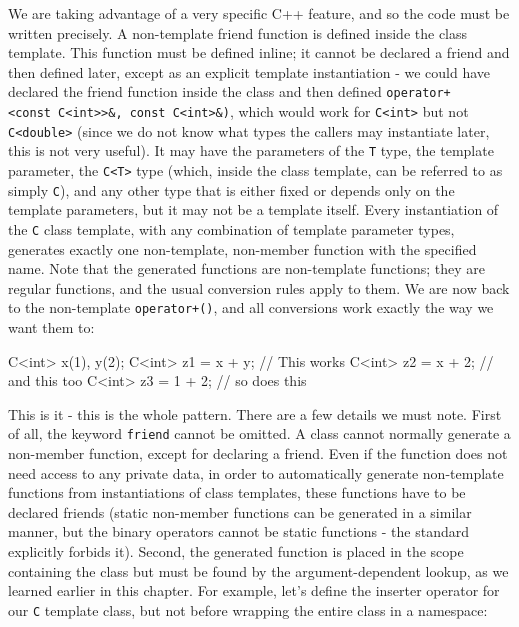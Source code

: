 We are taking advantage of a very specific C++ feature, and so the code must be written precisely. A non-template friend function is defined inside the class template. This function must be defined inline; it cannot be declared a friend and then defined later, except as an explicit template instantiation - we could have declared the friend function inside the class and then defined \texttt{operator+\textless{}const\ C\textless{}int\textgreater{}\textgreater{}\&,\ const\ C\textless{}int\textgreater{}\&)}, which would work for \texttt{C\textless{}int\textgreater{}} but not \texttt{C\textless{}double\textgreater{}} (since we do not know what types the callers may instantiate later, this is not very useful). It may have the parameters of the \texttt{T} type, the template parameter, the \texttt{C\textless{}T\textgreater{}} type (which, inside the class template, can be referred to as simply \texttt{C}), and any other type that is either fixed or depends only on the template parameters, but it may not be a template itself. Every instantiation of the \texttt{C} class template, with any combination of template parameter types, generates exactly one non-template, non-member function with the specified name. Note that the generated functions are non-template functions; they are regular functions, and the usual conversion rules apply to them. We are now back to the non-template \texttt{operator+()}, and all conversions work exactly the way we want them to:

\begin{code}
C<int> x(1), y(2);
C<int> z1 = x + y; // This works
C<int> z2 = x + 2; // and this too
C<int> z3 = 1 + 2; // so does this
\end{code}

This is it - this is the whole pattern. There are a few details we must note. First of all, the keyword \texttt{friend} cannot be omitted. A class cannot normally generate a non-member function, except for declaring a friend. Even if the function does not need access to any private data, in order to automatically generate non-template functions from instantiations of class templates, these functions have to be declared friends (static non-member functions can be generated in a similar manner, but the binary operators cannot be static functions - the standard explicitly forbids it). Second, the generated function is placed in the scope containing the class but must be found by the argument-dependent lookup, as we learned earlier in this chapter. For example, let's define the inserter operator for our \texttt{C} template class, but not before wrapping the entire class in a namespace:

